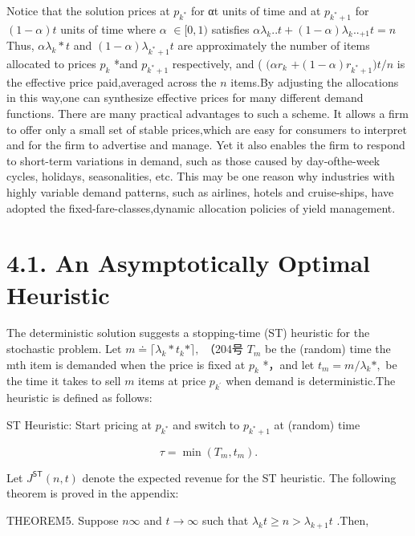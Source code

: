Notice that the solution prices at \(p _ { k ^ { * } }\) for αt units of
time and at \(p _ { k ^ { * } + 1 }\) for \(( 1 - \alpha ) t\) units of
time where \(\alpha\) \(\in [ 0 , 1 )\) satisfies
\(\alpha \lambda _ { k } . . t + ( 1 - \alpha ) \lambda _ { k } . . _ { + 1 } t = n\)
Thus, \(\alpha \lambda _ { k } { * } t\) and
\(( 1 - \alpha ) \lambda _ { k ^ { * } + 1 } t\) are approximately the
number of items allocated to prices \(p _ { k }\) *and
\(p _ { k ^ { * } + 1 }\) respectively, and ( \(( \alpha r _ { k }\)
\(+ ( 1 - \alpha ) r _ { k ^ { * } + 1 } ) t / n\) is the effective
price paid,averaged across the \(n\) items.By adjusting the allocations
in this way,one can synthesize effective prices for many different
demand functions. There are many practical advantages to such a scheme.
It allows a firm to offer only a small set of stable prices,which are
easy for consumers to interpret and for the firm to advertise and
manage. Yet it also enables the firm to respond to short-term variations
in demand, such as those caused by day-ofthe-week cycles, holidays,
seasonalities, etc. This may be one reason why industries with highly
variable demand patterns, such as airlines, hotels and cruise-ships,
have adopted the fixed-fare-classes,dynamic allocation policies of yield
management.

\section{4.1. An Asymptotically Optimal
Heuristic}\label{an-asymptotically-optimal-heuristic}

The deterministic solution suggests a stopping-time (ST) heuristic for
the stochastic problem. Let
\(m \doteq \lceil \lambda _ { k } { * } t _ { k } { * } \rceil ,\)
（204号 \(T _ { m }\) be the (random) time the mth item is demanded when
the price is fixed at \(p _ { k }\) *，and let
\(t _ { m } = m / \lambda _ { k } * ,\) be the time it takes to sell
\(m\) items at price \(p _ { k ^ { \prime } }\) when demand is
deterministic.The heuristic is defined as follows:

ST Heuristic: Start pricing at \(p _ { k ^ { * } }\) and switch to
\(p _ { k ^ { * } + 1 }\) at (random) time

\[
\tau = \operatorname* { m i n } ( T _ { m } , t _ { m } ) .
\]

Let \(J ^ { \mathsf { S T } } ( n , t )\) denote the expected revenue
for the ST heuristic. The following theorem is proved in the appendix:

THEOREM5. Suppose \(n  \infty\) and \(t \to \infty\) such that
\(\lambda _ { k } t \geq n > \lambda _ { k + 1 } t\) .Then,

